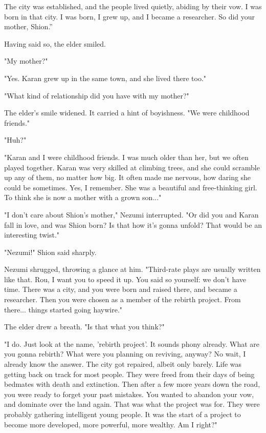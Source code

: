 The city was established, and the people lived quietly, abiding by their
vow. I was born in that city. I was born, I grew up, and I became a
researcher. So did your mother, Shion.''

Having said so, the elder smiled.

"My mother?"

"Yes. Karan grew up in the same town, and she lived there too."

"What kind of relationship did you have with my mother?"

The elder's smile widened. It carried a hint of boyishness. "We were
childhood friends."

"Huh?"

"Karan and I were childhood friends. I was much older than her, but we
often played together. Karan was very skilled at climbing trees, and she
could scramble up any of them, no matter how big. It often made me
nervous, how daring she could be sometimes. Yes, I remember. She was a
beautiful and free-thinking girl. To think she is now a mother with a
grown son..."

"I don't care about Shion's mother," Nezumi interrupted. "Or did you and
Karan fall in love, and was Shion born? Is that how it's gonna unfold?
That would be an interesting twist."

"Nezumi!" Shion said sharply.

Nezumi shrugged, throwing a glance at him. "Third-rate plays are usually
written like that. Rou, I want you to speed it up. You said so yourself:
we don't have time. There was a city, and you were born and raised
there, and became a researcher. Then you were chosen as a member of the
rebirth project. From there... things started going haywire."

The elder drew a breath. "Is that what you think?"

"I do. Just look at the name, 'rebirth project'. It sounds phony
already. What are you gonna rebirth? What were you planning on reviving,
anyway? No wait, I already know the answer. The city got repaired,
albeit only barely. Life was getting back on track for most people. They
were freed from their days of being bedmates with death and extinction.
Then after a few more years down the road, you were ready to forget your
past mistakes. You wanted to abandon your vow, and dominate over the
land again. That was what the project was for. They were probably
gathering intelligent young people. It was the start of a project to
become more developed, more powerful, more wealthy. Am I right?"

